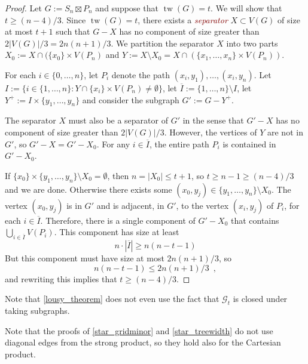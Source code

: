 \documentclass{patmorin}
\newcommand{\defin}[1]{\textcolor{Maroon}{\emph{#1}}}
\DeclareMathOperator{\tw}{tw}
\begin{document}
\begin{proof}
  Let $G:=S_n\boxtimes P_n$ and suppose that $\tw(G)=t$.  We will show that $t\ge (n-4)/3$. Since $\tw(G)=t$, there exists a \defin{separator} $X\subset V(G)$ of size at most $t+1$ such that $G-X$ has no component of size greater than $2|V(G)|/3=2n(n+1)/3$.  We partition the separator $X$ into two parts $X_0:=X\cap(\{x_0\}\times V(P_n)$ and $Y:=X\setminus X_0=X\cap(\{x_1,\ldots,x_n\}\times V(P_n))$.

  For each $i\in\{0,\ldots,n\}$, let $P_i$ denote the path $(x_i,y_1),\ldots,(x_i,y_n)$.  Let $I:=\{i\in\{1,\ldots,n\}:Y\cap\{x_i\}\times V(P_n)\neq\emptyset\}$, let $\overline{I}:=\{1,\ldots,n\}\setminus I$, let $Y^+:= I\times\{y_1,\ldots,y_n\}$ and consider the subgraph $G':=G-Y^+$.

  The separator $X$ must also be a separator of $G'$ in the sense that $G'-X$ has no component of size greater than $2|V(G)|/3$.  However, the vertices of $Y$ are not in $G'$, so $G'-X=G'-X_0$.  For any $i\in\overline{I}$, the entire path $P_i$ is contained in $G'-X_0$.

  If $\{x_0\}\times \{y_1,\ldots,y_n\}\setminus X_0=\emptyset$, then $n=|X_0|\le t+1$, so $t\ge n-1\ge (n-4)/3$ and we are done.  Otherwise there exists some $(x_0,y_j)\in \{y_1,\ldots,y_n\}\setminus X_0$.  The vertex $(x_0,y_j)$ is in $G'$ and is adjacent, in $G'$, to the vertex $(x_i,y_j)$ of $P_i$, for each $i\in\overline{I}$.  Therefore, there is a single component of $G'-X_0$ that contains $\bigcup_{i\in \overline{I}} V(P_i)$.  This component has size at least
  \[
    n\cdot|\overline{I}| \ge n(n-t-1)
  \]
  But this component must have size at most $2n(n+1)/3$, so
  \[
    n(n-t-1) \le 2n(n+1)/3 \enspace ,
  \]
  and rewriting this implies that $t\ge (n-4)/3$.
\end{proof}

\begin{rem}
  Note that \cref{lousy_theorem} does not even use the fact that $\mathcal{G}_t$ is closed under taking subgraphs.
\end{rem}

\begin{rem}
  Note that the proofs of \cref{star_gridminor} and \cref{star_treewidth} do not use diagonal edges from the strong product, so they hold also for the Cartesian product.
\end{rem}
\end{document}
